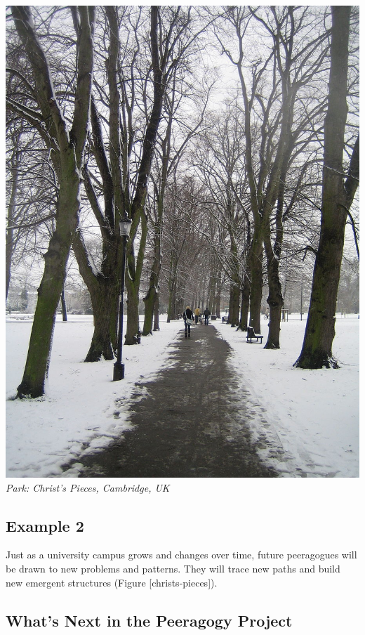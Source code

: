 \includegraphics{images/ChristsPieces.jpg}\\
\emph{Park: Christ's Pieces, Cambridge, UK}

\hypertarget{example-2}{%
\subsection{Example 2}\label{example-2}}

Just as a university campus grows and changes over time, future
peeragogues will be drawn to new problems and patterns. They will trace
new paths and build new emergent structures (Figure
{[}christs-pieces{]}).

\hypertarget{whats-next-in-the-peeragogy-project}{%
\subsection{What's Next in the Peeragogy
Project}\label{whats-next-in-the-peeragogy-project}}

